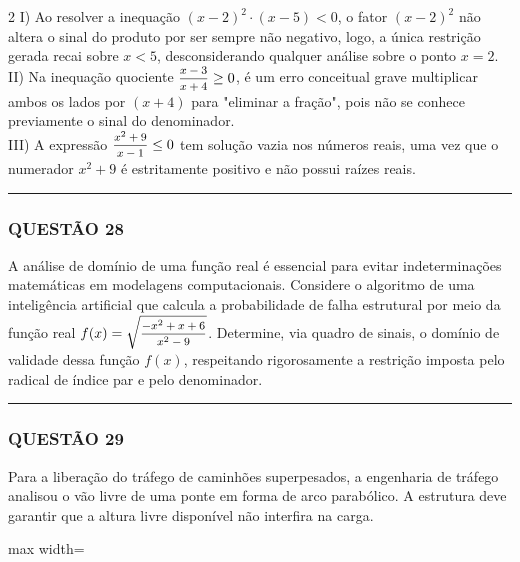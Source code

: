 \documentclass[11pt, a4paper]{article}
\begin{document}
\begin{multicols*}{2}
I) Ao resolver a inequação $ (x - 2)^2 \cdot (x - 5) < 0 $, o fator $ (x - 2)^2 $ não altera o sinal do produto por ser sempre não negativo, logo, a única restrição gerada recai sobre $ x < 5 $, desconsiderando qualquer análise sobre o ponto $ x = 2 $.\\[0.3cm]
II) Na inequação quociente $ \mfrac{x - 3}{x + 4} \ge 0 $, é um erro conceitual grave multiplicar ambos os lados por $ (x + 4) $ para "eliminar a fração", pois não se conhece previamente o sinal do denominador.\\[0.3cm]
III) A expressão $ \mfrac{x^2 + 9}{x - 1} \le 0 $ tem solução vazia nos números reais, uma vez que o numerador $ x^2 + 9 $ é estritamente positivo e não possui raízes reais.

\vspace{0cm} \noindent\textcolor{CorLinha}{\rule{\linewidth}{0.5pt}} \vspace{-0.2cm}
\subsubsection*{QUESTÃO 28}
A análise de domínio de uma função real é essencial para evitar indeterminações matemáticas em modelagens computacionais. Considere o algoritmo de uma inteligência artificial que calcula a probabilidade de falha estrutural por meio da função real $ f(x) = \sqrt{\mfrac{-x^2 + x + 6}{x^2 - 9}} $. Determine, via quadro de sinais, o domínio de validade dessa função $ f(x) $, respeitando rigorosamente a restrição imposta pelo radical de índice par e pelo denominador.

\vspace{0cm} \noindent\textcolor{CorLinha}{\rule{\linewidth}{0.5pt}} \vspace{-0.2cm}
\subsubsection*{QUESTÃO 29}
Para a liberação do tráfego de caminhões superpesados, a engenharia de tráfego analisou o vão livre de uma ponte em forma de arco parabólico. A estrutura deve garantir que a altura livre disponível não interfira na carga.

\begin{center}
\begin{adjustbox}{max width=\linewidth}
\end{adjustbox}
\end{center}
\end{multicols*}
\end{document}
